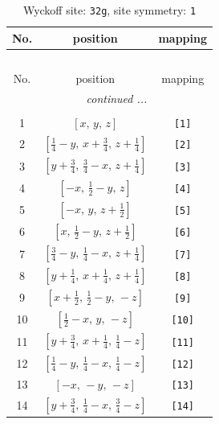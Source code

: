 \documentclass[fleqn,8pt]{jsarticle}
\begin{document}
\renewcommand{\arraystretch}{1.2}
\begin{longtable}{ccc}
\caption{Wyckoff site: {\tt 32g}, site symmetry: {\tt 1}}
 \\
 \hline \hline
No. & position & mapping \\ \hline \endfirsthead

\multicolumn{2}{l}{\tablename\ \thetable{}} \\
 \hline \hline
No. & position & mapping \\ \hline \endhead

 \hline \hline
\multicolumn{2}{r}{\footnotesize\it continued ...} \\ \endfoot

 \hline \hline
\multicolumn{2}{r}{} \\ \endlastfoot

1 & $\left[ x,\, y,\, z \right]$ & {\tt [1]} \\ \hline
2 & $\left[ \frac{1}{4} - y,\, x + \frac{3}{4},\, z + \frac{1}{4} \right]$ & {\tt [2]} \\ \hline
3 & $\left[ y + \frac{3}{4},\, \frac{3}{4} - x,\, z + \frac{1}{4} \right]$ & {\tt [3]} \\ \hline
4 & $\left[ - x,\, \frac{1}{2} - y,\, z \right]$ & {\tt [4]} \\ \hline
5 & $\left[ - x,\, y,\, z + \frac{1}{2} \right]$ & {\tt [5]} \\ \hline
6 & $\left[ x,\, \frac{1}{2} - y,\, z + \frac{1}{2} \right]$ & {\tt [6]} \\ \hline
7 & $\left[ \frac{3}{4} - y,\, \frac{1}{4} - x,\, z + \frac{1}{4} \right]$ & {\tt [7]} \\ \hline
8 & $\left[ y + \frac{1}{4},\, x + \frac{1}{4},\, z + \frac{1}{4} \right]$ & {\tt [8]} \\ \hline
9 & $\left[ x + \frac{1}{2},\, \frac{1}{2} - y,\, - z \right]$ & {\tt [9]} \\ \hline
10 & $\left[ \frac{1}{2} - x,\, y,\, - z \right]$ & {\tt [10]} \\ \hline
11 & $\left[ y + \frac{3}{4},\, x + \frac{1}{4},\, \frac{1}{4} - z \right]$ & {\tt [11]} \\ \hline
12 & $\left[ \frac{1}{4} - y,\, \frac{1}{4} - x,\, \frac{1}{4} - z \right]$ & {\tt [12]} \\ \hline
13 & $\left[ - x,\, - y,\, - z \right]$ & {\tt [13]} \\ \hline
14 & $\left[ y + \frac{3}{4},\, \frac{1}{4} - x,\, \frac{3}{4} - z \right]$ & {\tt [14]} \\ \hline

\end{longtable}
\end{document}
